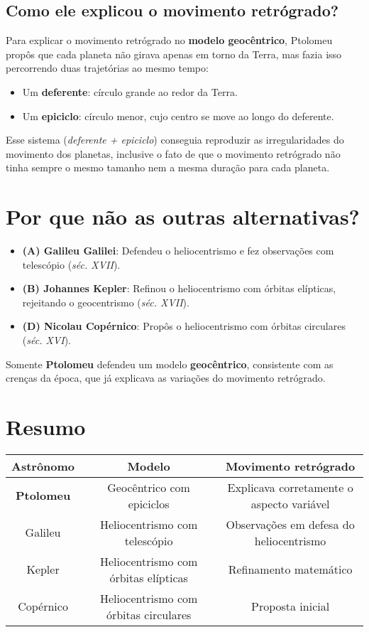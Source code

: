 \begin{flushleft}
\subsection*{Como ele explicou o movimento retrógrado?}
Para explicar o movimento retrógrado no \textbf{modelo geocêntrico}, Ptolomeu propôs que cada planeta não girava apenas em torno da Terra, mas fazia isso percorrendo duas trajetórias ao mesmo tempo:
\begin{itemize}
    \item Um \textbf{deferente}: círculo grande ao redor da Terra.
    \item Um \textbf{epiciclo}: círculo menor, cujo centro se move ao longo do deferente.
\end{itemize}

Esse sistema (\textit{deferente + epiciclo}) conseguia reproduzir as irregularidades do movimento dos planetas, inclusive o fato de que o movimento retrógrado não tinha sempre o mesmo tamanho nem a mesma duração para cada planeta.

\section*{Por que não as outras alternativas?}

\begin{itemize}
    \item \textbf{(A) Galileu Galilei}: Defendeu o heliocentrismo e fez observações com telescópio (\textit{séc. XVII}).
    \item \textbf{(B) Johannes Kepler}: Refinou o heliocentrismo com órbitas elípticas, rejeitando o geocentrismo (\textit{séc. XVII}).
    \item \textbf{(D) Nicolau Copérnico}: Propôs o heliocentrismo com órbitas circulares (\textit{séc. XVI}).
\end{itemize}

Somente \textbf{Ptolomeu} defendeu um modelo \textbf{geocêntrico}, consistente com as crenças da época, que já explicava as variações do movimento retrógrado.

\section*{Resumo}

\begin{center}
\small
\begin{tabular}{|c|c|c|}
\hline
\textbf{Astrônomo} & \textbf{Modelo} & \textbf{Movimento retrógrado} \\
\hline
\textbf{Ptolomeu} & Geocêntrico com epiciclos & Explicava corretamente o aspecto variável \\
\hline
Galileu & Heliocentrismo com telescópio & Observações em defesa do heliocentrismo \\
\hline
Kepler & Heliocentrismo com órbitas elípticas & Refinamento matemático \\
\hline
Copérnico & Heliocentrismo com órbitas circulares & Proposta inicial \\
\hline
\end{tabular}
\end{center}



\end{flushleft}
